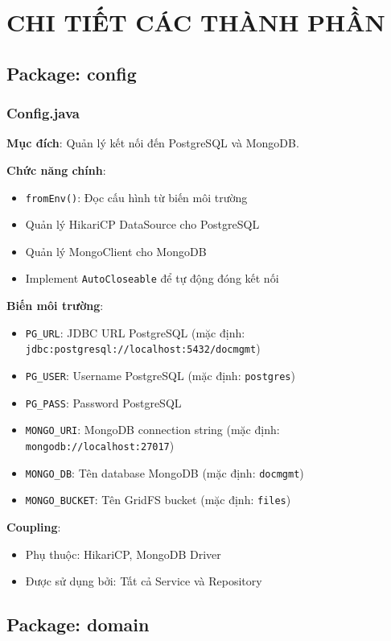 \documentclass[12pt,a4paper]{article}
\begin{document}
\section{CHI TIẾT CÁC THÀNH PHẦN}

\subsection{Package: config}

\subsubsection{Config.java}
\textbf{Mục đích}: Quản lý kết nối đến PostgreSQL và MongoDB.

\textbf{Chức năng chính}:
\begin{itemize}
    \item \texttt{fromEnv()}: Đọc cấu hình từ biến môi trường
    \item Quản lý HikariCP DataSource cho PostgreSQL
    \item Quản lý MongoClient cho MongoDB
    \item Implement \texttt{AutoCloseable} để tự động đóng kết nối
\end{itemize}

\textbf{Biến môi trường}:
\begin{itemize}
    \item \texttt{PG\_URL}: JDBC URL PostgreSQL (mặc định: \texttt{jdbc:postgresql://localhost:5432/docmgmt})
    \item \texttt{PG\_USER}: Username PostgreSQL (mặc định: \texttt{postgres})
    \item \texttt{PG\_PASS}: Password PostgreSQL
    \item \texttt{MONGO\_URI}: MongoDB connection string (mặc định: \texttt{mongodb://localhost:27017})
    \item \texttt{MONGO\_DB}: Tên database MongoDB (mặc định: \texttt{docmgmt})
    \item \texttt{MONGO\_BUCKET}: Tên GridFS bucket (mặc định: \texttt{files})
\end{itemize}

\textbf{Coupling}: 
\begin{itemize}
    \item Phụ thuộc: HikariCP, MongoDB Driver
    \item Được sử dụng bởi: Tất cả Service và Repository
\end{itemize}

\subsection{Package: domain}
\end{document}
